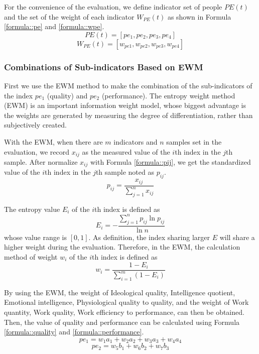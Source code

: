 \documentclass{mcmthesis}
\begin{document}
For the convenience of the evaluation, we define indicator set of people $PE(t)$ and the set of the weight of each indicator $W_{PE}(t)$ as shown in Formula \ref{formula::pe} and \ref{formula::wpe}.
\begin{equation}
    PE(t)=[pe_1,pe_2,pe_3,pe_4]
    \label{formula::pe}
\end{equation}
\begin{equation}
    W_{PE}(t) = [w_{pe1},w_{pe2},w_{pe3},w_{pe4}]
    \label{formula::wpe}
\end{equation}

\subsubsection{Combinations of Sub-indicators Based on EWM}
First we use the EWM method to make the combination of the sub-indicators of the index $pe_1$ (quality) and $pe_2$ (performance). The entropy weight method (EWM) is an important information weight model, whose biggest advantage is the weights are generated by measuring the degree of differentiation, rather than subjectively created.

With the EWM, when there are $m$ indicators and $n$ samples set in the evaluation, we record $x_{ij}$ as the measured value of the $i$th index in the $j$th sample. After normalize $x_{ij}$ with Formula \ref{formula::pij}, we get the standardized value of the $i$th index in the $j$th sample noted as $p_{ij}$\cite{2}.
\begin{equation}
    p_{ij}=\frac{x_{ij}}{\sum_{j=1}^n x_{ij}}
    \label{formula::pij}
\end{equation}

The entropy value $E_i$ of the $i$th index is defined as
\begin{equation}
    E_i = - \frac{ \sum_{j=1}^n p_{ij} \ln p_{ij} }{\ln n}
\end{equation}  
whose value range is $[0,1]$. As definition, the index sharing larger $E$ will share a higher weight during the evaluation. Therefore, in the EWM, the calculation method of weight $w_i$ of the $i$th index is defined as
\begin{equation}
    w_i = \frac{1-E_i}{\sum_{i=1}^m(1-E_i)}
\end{equation}
    
By using the EWM, the weight of Ideological quality, Intelligence quotient, Emotional intelligence, Physiological quality to quality, and the weight of Work quantity, Work quality, Work efficiency to performance, can then be obtained. Then, the value of quality and performance can be calculated using Formula \ref{formula::quality} and \ref{formula::performance}.
\begin{equation}
    pe_1 = w_1a_1+w_2a_2+w_3a_3+w_4a_4
    \label{formula::quality}
\end{equation}
\begin{equation}
    pe_2 =w_5b_1+w_6b_2+w_7b_3
    \label{formula::performance}
\end{equation}
\end{document}

